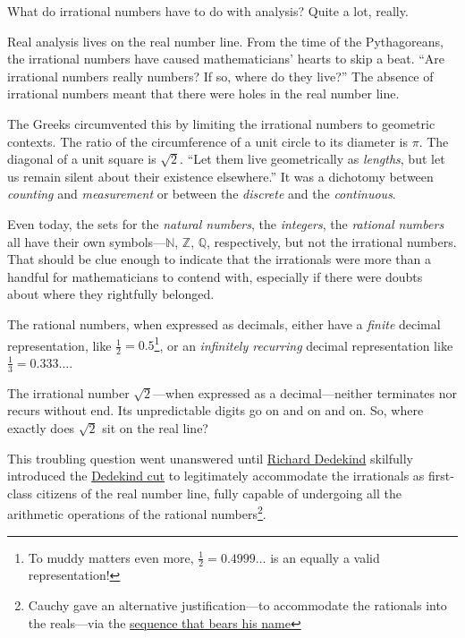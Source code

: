 \documentclass[
  a4paper,
]{article}
\begin{document}
What do irrational numbers have to do with analysis? Quite a lot,
really.

Real analysis lives on the real number line. From the time of the
Pythagoreans, the irrational numbers have caused mathematicians' hearts
to skip a beat. ``Are irrational numbers really numbers? If so, where do
they live?'' The absence of irrational numbers meant that there were
holes in the real number line.

The Greeks circumvented this by limiting the irrational numbers to
geometric contexts. The ratio of the circumference of a unit circle to
its diameter is \(\pi\). The diagonal of a unit square is \(\sqrt{2}\).
``Let them live geometrically as \emph{lengths}, but let us remain
silent about their existence elsewhere.'' It was a dichotomy between
\emph{counting} and \emph{measurement} or between the \emph{discrete}
and the \emph{continuous}.

Even today, the sets for the \emph{natural numbers}, the
\emph{integers}, the \emph{rational numbers} all have their own
symbols---\(\mathbb{N}\), \(\mathbb{Z}\), \(\mathbb{Q}\), respectively,
but not the irrational numbers. That should be clue enough to indicate
that the irrationals were more than a handful for mathematicians to
contend with, especially if there were doubts about where they
rightfully belonged.

The rational numbers, when expressed as decimals, either have a
\emph{finite} decimal representation, like
\(\frac{1}{2} = 0.5\)\footnote{To muddy matters even more,
  \(\frac{1}{2} = 0.4999\dots\) is an equally a valid representation!},
or an \emph{infinitely recurring} decimal representation like
\(\frac{1}{3} = 0.333\dots\).

The irrational number \(\sqrt{2}\)---when expressed as a
decimal---neither terminates nor recurs without end. Its unpredictable
digits go on and on and on. So, where exactly does \(\sqrt{2}\) sit on
the real line?

This troubling question went unanswered until
\href{https://plato.stanford.edu/entries/dedekind-foundations/}{Richard
Dedekind} skilfully introduced the
\href{https://www.britannica.com/science/Dedekind-cut}{Dedekind cut} to
legitimately accommodate the irrationals as first-class citizens of the
real number line, fully capable of undergoing all the arithmetic
operations of the rational numbers\footnote{Cauchy gave an alternative
  justification---to accommodate the rationals into the reals---via the
  \hyperref[cauchy-sequence]{sequence that bears his name}}.
\end{document}

